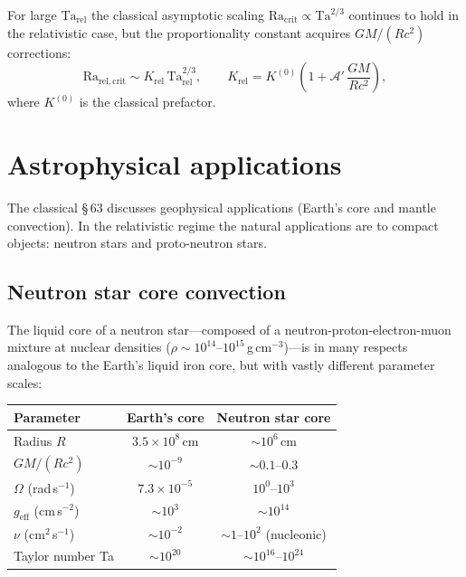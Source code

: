 For large $\mathrm{Ta}_{\mathrm{rel}}$ the classical
asymptotic scaling
$\mathrm{Ra}_{\mathrm{crit}} \propto \mathrm{Ta}^{2/3}$
continues to hold in the relativistic case, but the
proportionality constant acquires $GM/(Rc^{2})$ corrections:
\begin{equation}\label{eq:rel-6-asymptotic}
  \mathrm{Ra}_{\mathrm{rel,crit}}
  \sim K_{\mathrm{rel}}\,\mathrm{Ta}_{\mathrm{rel}}^{2/3},
  \qquad
  K_{\mathrm{rel}}
  = K^{(0)}\!\left(
      1 + \mathcal{A}'\,\frac{GM}{Rc^{2}}\right),
\end{equation}
where $K^{(0)}$ is the classical prefactor.

\section{Astrophysical applications}\label{sec:rel-63}

The classical \S\,63 discusses geophysical applications (Earth's
core and mantle convection).  In the relativistic regime the natural
applications are to compact objects: neutron stars and proto-neutron
stars.

\subsection{Neutron star core convection}\label{sec:rel-63a}

The liquid core of a neutron star---composed of a
neutron-proton-electron-muon mixture at nuclear densities
($\rho \sim 10^{14}$--$10^{15}$\,g\,cm$^{-3}$)---is in many
respects analogous to the Earth's liquid iron core, but with
vastly different parameter scales:
\begin{center}
\begin{tabular}{lcc}
\hline
Parameter & Earth's core & Neutron star core \\
\hline
Radius $R$ & $3.5\times 10^{8}$\,cm
           & $\sim 10^{6}$\,cm \\
$GM/(Rc^{2})$ & $\sim 10^{-9}$ & $\sim 0.1$--$0.3$ \\
$\Omega$ (rad\,s$^{-1}$)
           & $7.3\times 10^{-5}$
           & $10^{0}$--$10^{3}$ \\
$g_{\mathrm{eff}}$ (cm\,s$^{-2}$)
           & $\sim 10^{3}$
           & $\sim 10^{14}$ \\
$\nu$ (cm$^{2}$\,s$^{-1}$)
           & $\sim 10^{-2}$
           & $\sim 1$--$10^{2}$ (nucleonic) \\
Taylor number Ta
           & $\sim 10^{20}$
           & $\sim 10^{16}$--$10^{24}$ \\
\hline
\end{tabular}
\end{center}

